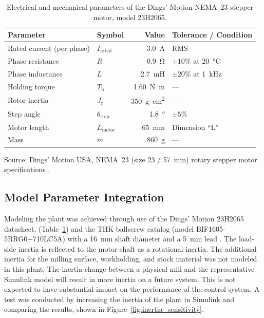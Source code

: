 \begin{table}[htbp]
	\centering
	\caption{Electrical and mechanical parameters of the Dings' Motion NEMA~23 stepper motor, model 23H2065. \cite{dings_nema23_2026}}
	\label{tab:motor_23H2065}
	\begin{tabular}{@{}llrl@{}}
		\toprule
		Parameter & Symbol & Value & Tolerance / Condition \\
		\midrule
		Rated current (per phase) & $I_{\mathrm{rated}}$ & \SI{3.0}{\ampere} & RMS \\
		Phase resistance          & $R$                  & \SI{0.9}{\ohm}    & $\pm 10\%$ at \SI{20}{\celsius} \\
		Phase inductance          & $L$                  & \SI{2.7}{\milli\henry} & $\pm 20\%$ at \SI{1}{\kilo\hertz} \\
		Holding torque            & $T_{\mathrm{h}}$     & \SI{1.60}{\newton\meter} & --- \\
		Rotor inertia             & $J_{\mathrm{r}}$     & \SI{350}{\gram\centi\meter\squared} & --- \\
		Step angle                & $\theta_{\mathrm{step}}$ & \SI{1.8}{\degree} & $\pm 5\%$ \\
		Motor length              & $L_{\mathrm{motor}}$ & \SI{65}{\milli\meter} & Dimension ``L'' \\
		Mass                      & $m$                  & \SI{860}{\gram}   & --- \\
		\bottomrule
	\end{tabular}
	\vspace{0.5ex}
	
	\footnotesize Source: Dings' Motion USA, NEMA~23 (size 23 / \SI{57}{\milli\meter}) rotary stepper motor specifications \cite{dings_nema23_2026}.
\end{table}



\subsection{Model Parameter Integration}\label{modelParameterIntegration}

Modeling the plant was achieved through use of the Dings' Motion 23H2065 datasheet, (Table~\ref{tab:motor_23H2065}) and the THK ballscrew catalog (model BIF1605-5RRG0+710LC5A) with a \SI{16}{\milli\meter} shaft diameter and a \SI{5}{\milli\meter} lead \cite{thk_ball_screw}. The load-side inertia is reflected to the motor shaft as a rotational inertia. The additional inertia for the milling surface, workholding, and stock material was not modeled in this plant. The inertia change between a physical mill and the representative Simulink model will result in more inertia on a future system. This is not expected to have substantial impact on the performance of the control system. A test was conducted by increasing the inertia of the plant in Simulink and comparing the results, shown in Figure~\ref{fig:inertia_sensitivity}.   

